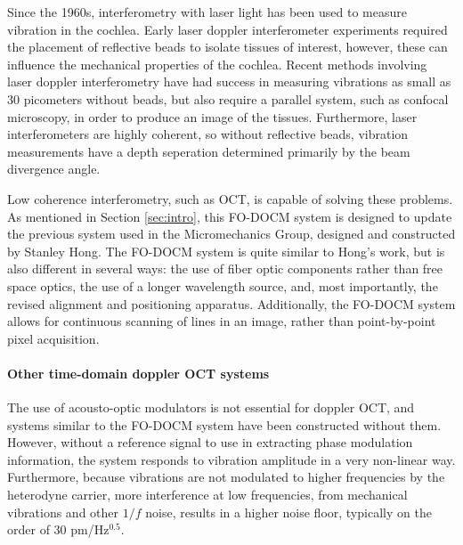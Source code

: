 Since the 1960s, interferometry with laser light has been used to measure vibration in the cochlea. Early laser doppler interferometer experiments required the placement of reflective beads to isolate tissues of interest, however, these can influence the mechanical properties of the cochlea. \cite{Nuttall2012} Recent methods involving laser doppler interferometry have had success in measuring vibrations as small as 30 picometers without beads, but also require a parallel system, such as confocal microscopy, in order to produce an image of the tissues. Furthermore, laser interferometers are highly coherent, so without reflective beads, vibration measurements have a depth seperation determined primarily by the beam divergence angle. \cite{Jacob2009} \cite{Ren2002} \cite{Ren2011} 

Low coherence interferometry, such as OCT, is capable of solving these problems. As mentioned in Section \ref{sec:intro}, this FO-DOCM system is designed to update the previous system used in the Micromechanics Group, designed and constructed by Stanley Hong. The FO-DOCM system is quite similar to Hong's work, but is also different in several ways: the use of fiber optic components rather than free space optics, the use of a longer wavelength source, and, most importantly, the revised alignment and positioning apparatus. Additionally, the FO-DOCM system allows for continuous scanning of lines in an image, rather than point-by-point pixel acquisition. \cite{hong}

\paragraph{Other time-domain doppler OCT systems} The use of acousto-optic modulators is not essential for doppler OCT, and systems similar to the FO-DOCM system have been constructed without them. However, without a reference signal to use in extracting phase modulation information, the system responds to vibration amplitude in a very non-linear way. Furthermore, because vibrations are not modulated to higher frequencies by the heterodyne carrier, more interference at low frequencies, from mechanical vibrations and other $1/f$ noise, results in a higher noise floor, typically on the order of 30 pm/Hz$^{0.5}$. \cite{Choudhury2006}


